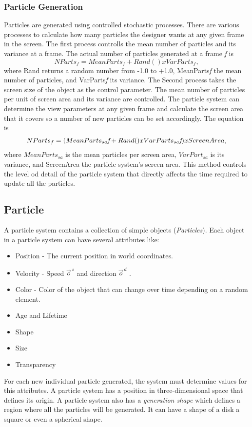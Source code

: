 \subsubsection{Particle Generation}
Particles are generated using controlled stochastic processes. There are various processes to calculate how many particles the designer wants at any given frame in the screen. The first process controlls the mean number of particles and its variance at a frame. The actual number of particles generated at a frame \emph{f} is 
\begin{equation}
\label{eqn:01}
	NParts_{f} = MeanParts_{f} + Rand() x VarParts_{f},
\end{equation}
where Rand returns a random number from -1.0 to +1.0, MeanParts\emph{f} the mean number of particles, and VarParts\emph{f} its variance.
	The Second process takes the screen size of the object as the control parameter. The mean number of particles per unit of screen area and its variance are controlled. The particle system can determine the view parameters at any given frame and calculate the screen area that it covers so a number of new particles can be set accordingly. The equation is
\begin{equation}
\label{eqn:01}
	NParts_{f} = (MeanParts_{sa}\emph{f} + Rand() x VarParts_{sa}\emph{f}) x ScreenArea,
\end{equation}
where $MeanParts_{sa}$ is the mean particles per screen area, $VarPart_{sa}$ is its variance, and ScreenArea the particle system's screen area. This method controls the level od detail of the particle system that directly affects the time required to update all the particles.

\subsection{Particle}

A particle system contains a collection of simple objects (\emph{Particles}). Each object in a particle system can have several attributes like:
\begin{itemize}
\item Position - The current position in world coordinates.
\item Velocity - Speed $\vec{o}^{\,s}$ and direction $\vec{o}^{\,d}$ .
\item Color - Color of the object that can change over time depending on a random element.
\item Age and Lifetime 
\item Shape
\item Size
\item Transparency
\end{itemize}
	For each new individual particle generated, the system must determine values for this attributes.
A particle system has a position in three-dimensional space that defines its origin. A particle system also has a \emph{generation shape} which defines a region where all the particles will be generated. It can have a shape of a disk a square or even a spherical shape.

